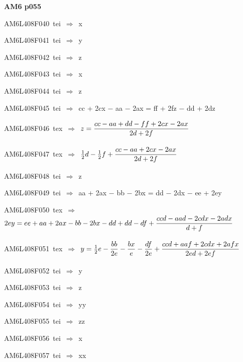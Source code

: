 \par\vfill\eject
{\bf\hfill AM6 p055\hfill\hbox{}}\par\bigskip
{\sixrm AM6L408F040\ {\sixit tei}\ }$\Rightarrow$\ {\tenit x}\par\smallskip
{\sixrm AM6L408F041\ {\sixit tei}\ }$\Rightarrow$\ {\tenit y}\par\smallskip
{\sixrm AM6L408F042\ {\sixit tei}\ }$\Rightarrow$\ {\tenit z}\par\smallskip
{\sixrm AM6L408F043\ {\sixit tei}\ }$\Rightarrow$\ {\tenit x}\par\smallskip
{\sixrm AM6L408F044\ {\sixit tei}\ }$\Rightarrow$\ {\tenit z}\par\smallskip
{\sixrm AM6L408F045\ {\sixit tei}\ }$\Rightarrow$\ {\tenit cc} + 2{\tenit cx} − {\tenit aa} − 2{\tenit ax} = {\tenit ff} + 2{\tenit fz} − {\tenit dd} + 2{\tenit dz}\par\smallskip
{\sixrm AM6L408F046\ {\sixit tex}\ }$\Rightarrow$\ $z = {\displaystyle\strut {cc - aa + dd - ff + 2cx - 2ax}\over \displaystyle\strut {2d + 2f}}$\par\smallskip
{\sixrm AM6L408F047\ {\sixit tex}\ }$\Rightarrow$\ ${{1\over 2}}d - {{1\over 2}}f + {\displaystyle\strut {cc - aa + 2cx - 2ax}\over \displaystyle\strut {2d + 2f}}$\par\smallskip
{\sixrm AM6L408F048\ {\sixit tei}\ }$\Rightarrow$\ {\tenit z}\par\smallskip
{\sixrm AM6L408F049\ {\sixit tei}\ }$\Rightarrow$\ {\tenit aa} + 2{\tenit ax} − {\tenit bb} − 2{\tenit bx} = {\tenit dd} − 2{\tenit dx} − {\tenit ee} + 2{\tenit ey}\par\smallskip
{\sixrm AM6L408F050\ {\sixit tex}\ }$\Rightarrow$\ $2ey = ee + aa + 2ax - bb - 2bx - dd + dd - df + {\displaystyle\strut {ccd - aad - 2cdx - 2adx}\over \displaystyle\strut {d + f}}$\par\smallskip
{\sixrm AM6L408F051\ {\sixit tex}\ }$\Rightarrow$\ $y = {{1\over 2}}e - {{\displaystyle\strut bb\over \displaystyle\strut 2e}} - {{\displaystyle\strut bx\over \displaystyle\strut e}} - {{\displaystyle\strut df\over \displaystyle\strut 2e}} + {\displaystyle\strut {ccd + aaf + 2cdx + 2afx}\over \displaystyle\strut {2ed + 2ef}}$\par\smallskip
{\sixrm AM6L408F052\ {\sixit tei}\ }$\Rightarrow$\ {\tenit y}\par\smallskip
{\sixrm AM6L408F053\ {\sixit tei}\ }$\Rightarrow$\ {\tenit z}\par\smallskip
{\sixrm AM6L408F054\ {\sixit tei}\ }$\Rightarrow$\ {\tenit yy}\par\smallskip
{\sixrm AM6L408F055\ {\sixit tei}\ }$\Rightarrow$\ {\tenit zz}\par\smallskip
{\sixrm AM6L408F056\ {\sixit tei}\ }$\Rightarrow$\ {\tenit x}\par\smallskip
{\sixrm AM6L408F057\ {\sixit tei}\ }$\Rightarrow$\ {\tenit xx}\par\smallskip

